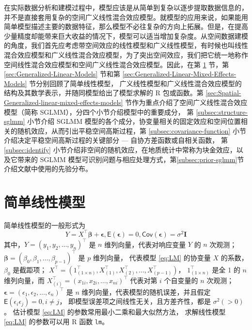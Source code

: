 \documentclass[12pt,a4paper,UTF8,twoside]{book}
\theoremstyle{definition}
\theoremstyle{definition}
\theoremstyle{definition}
\theoremstyle{remark}
\begin{document}
在实际数据分析和建模过程中，模型应该是从简单到复杂以逐步提取数据信息的，并不是直接套用复杂的空间广义线性混合效应模型。就模型的应用来说，如果能用简单模型描述主要的数据特征，那么模型不必往复杂的方向上拓展。但是，在提高少量精度却能带来巨大收益的情况下，模型可以适当增加复杂度。从空间数据建模的角度，我们首先应考虑带空间效应的线性模型和广义线性模型，有时候也叫线性混合效应模型和广义线性混合效应模型，为了突出空间效应，我们把它统一地称作空间线性混合效应模型和空间广义线性混合效应模型。因此，在第
\ref{sec:Linear-Models} 节，第 \ref{sec:Generalized-Linear-Models}
节和第 \ref{sec:Generalized-Linear-Mixed-Effects-Models}
节分别回顾了简单线性模型，
广义线性模型和广义线性混合效应模型的结构及其数学表示，并随同模型给出了模型求解的
R 包或函数。第 \ref{sec:Spatial-Generalized-linear-mixed-effects-models}
节作为重点介绍了空间广义线性混合效应模型（简称
SGLMM），分四个小节介绍模型中的重要成分， 第
\ref{subsec:structure-sglmm} 小节介绍 SGLMM
模型的各个成分，协变量相关的固定效应和空间位置相关的随机效应，从而引出平稳空间高斯过程，第
\ref{subsec:covariance-function} 小节介绍决定平稳空间高斯过程的关键部分
--- 自协方差函数或自相关函数， 第 \ref{subsec:identify}
小节介绍非空间的随机效应，在地质统计中常称为块金效应，以及它带来的 SGLMM
模型可识别问题与相应处理方式，第\ref{subsec:prior-sglmm}节介绍文献中使用的先验分布。

\hypertarget{sec:Linear-Models}{%
\section{简单线性模型}\label{sec:Linear-Models}}

简单线性模型的一般形式为 \begin{equation}
Y = X^{\top}\boldsymbol{\beta} + \boldsymbol{\epsilon}, \mathsf{E}(\boldsymbol{\epsilon}) = 0, \mathsf{Cov}(\boldsymbol{\epsilon}) = \sigma^2\mathbf{I}  \label{eq:LM}
\end{equation} \noindent 其中，\(Y = (y_1,y_2,\ldots,y_n)^{\top}\) 是
\(n\) 维列向量，代表对响应变量 \(Y\) 的 \(n\) 次观测；
\(\boldsymbol{\beta} = (\beta_0,\beta_1,\ldots,\beta_{p-1})^{\top}\) 是
\(p\) 维列向量， 代表模型 \eqref{eq:LM} 的协变量 \(X\) 的系数，\(\beta_0\)
是截距项；
\(X^{\top} = (1_{(1\times n)}^{\top},X_{(1)}^{\top},X_{(2)}^{\top},\ldots,X_{(p-1)}^{\top})\)，
\(1_{(1\times n)}^{\top}\) 是全 1 的 \(n\) 维列向量，而
\(X_{(i)}^{\top} = (x_{1i},x_{2i},\ldots,x_{ni})^{\top}\) 代表对第 \(i\)
个自变量的 \(n\) 次观测；
\(\boldsymbol{\epsilon} = (\epsilon_1,\epsilon_2,\ldots,\epsilon_n)^{\top}\)
是 \(n\) 维列向量，代表模型的随机误差，并且假定
\(\mathsf{E}(\epsilon_i \epsilon_j) = 0, i \ne j\)，
即模型误差项之间线性无关，且方差齐性，都是 \(\sigma^2(>0)\)。 估计模型
\eqref{eq:LM} 的参数常用最小二乘和最大似然方法， 求解线性模型 \eqref{eq:LM}
的参数可以用 R 函数 \texttt{lm}。
\end{document}
